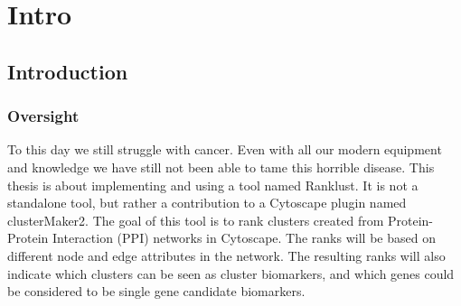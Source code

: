 \part{Intro}
\label{pa:intro}
\chapter{Introduction}
\section{Oversight}
To this day we still struggle with cancer. Even with all our modern equipment
and knowledge we have still not been able to tame this horrible disease. This
thesis is about implementing and using a tool named Ranklust. It is not a
standalone tool, but rather a contribution to a Cytoscape plugin named
clusterMaker2\cite{cm2}\cite{cm2-github}. The goal of this tool is to rank
clusters created from Protein-Protein Interaction (PPI) networks in Cytoscape.
The ranks will be based on different node and edge attributes in the network.
The resulting ranks will also indicate which clusters can be seen as cluster
biomarkers, and which genes could be considered to be single gene candidate
biomarkers. 

